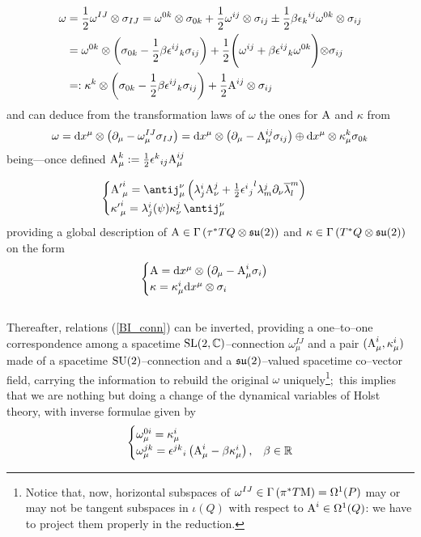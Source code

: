 \begin{align*}
    \omega&=\frac{1}{2}\omega^{IJ}\otimes\sigma_{IJ}=\omega^{0k}\otimes\sigma_{0k}+\frac{1}{2}\omega^{ij}\otimes\sigma_{ij}\pm\frac{1}{2}\beta{\epsilon_k}^{ij}\omega^{0k}\otimes\sigma_{ij}\\
    &=\omega^{0k}\otimes\left(\sigma_{0k}-\frac{1}{2}\beta{\epsilon^{ij}}_k\sigma_{ij}\right)+\frac{1}{2}\Biggl(\omega^{ij}+\beta{\epsilon^{ij}}_k\omega^{0k}\Biggl)\otimes\sigma_{ij}\\
    &=:\kappa^k\otimes\left(\sigma_{0k}-\frac{1}{2}\beta{\epsilon^{ij}}_k\sigma_{ij}\right)+\frac{1}{2}\text{\normalfont A}^{ij}\otimes\sigma_{ij}
\end{align*}
and can deduce from the transformation laws of $\omega$ the ones for $\text{\normalfont A}$ and $\kappa$ from
$$\omega=\text{\normalfont d} x^\mu\otimes\left(\partial_\mu-\omega^{IJ}_\mu\sigma_{IJ}\right)=\text{\normalfont d} x^\mu\otimes\left(\partial_\mu-\text{\normalfont A}^{ij}_\mu\sigma_{ij}\right)\oplus\text{\normalfont d} x^\mu\otimes\kappa^k_\mu\sigma_{0k}$$
being---once defined $\text{\normalfont A}^k_\mu:=\frac{1}{2}{\epsilon^k}_{ij}\text{\normalfont A}^{ij}_\mu$

$$\begin{cases}
{\A'}^i_\mu=\antij^\nu_\mu\left(\lambda^i_j\A_\nu^j+\frac{1}{2}{{\epsilon^i}_j}^l\lambda^j_m\der_\nu\overline{\lambda}^m_l\right)\\
{\kappa'}^i_\mu=\lambda^i_j(\psi)\kappa^j_\nu\,\antij^\nu_\mu
\end{cases}$$
providing a global description of $\text{\normalfont A}\in\Gamma\left(\tau^*TQ\otimes\mathfrak{su}(2)\right)$ and $\kappa\in\Gamma\left(T^*Q\otimes\mathfrak{su}(2)\right)$ on the form
$$\begin{cases}
    \text{\normalfont A}=\text{\normalfont d} x^\mu\otimes\left(\partial_\mu-\text{\normalfont A}^i_\mu\sigma_i\right)\\
    \kappa=\kappa^i_\mu\text{\normalfont d} x^\mu\otimes\sigma_i
\end{cases}$$
\\
Thereafter, relations (\ref{BI_conn}) can be inverted, providing a one--to--one correspondence among a spacetime $\text{\normalfont SL}(2,\mathbb{C})$--connection $\omega^{IJ}_\mu$ and a pair $(\text{\normalfont A}_\mu^i,\kappa^i_\mu)$ made of a spacetime $\text{\normalfont SU}(2)$--connection and a $\mathfrak{su}(2)$--valued spacetime co--vector field, carrying the information to rebuild the original $\omega$ uniquely\footnote{Notice that, now, horizontal subspaces of $\omega^{IJ}\in\Gamma\left(\pi^*T\text{\normalfont M}\right)=\Omega^1(P)$ may or may not be tangent subspaces in $\iota(Q)$ with respect to $\text{\normalfont A}^i\in\Omega^1(Q)$: we have to project them properly in the reduction.};\, this implies that we are nothing but doing a change of the dynamical variables of Holst theory, with inverse formulae given by
\begin{equation}\label{inverse_BI}
    \begin{cases}
    \omega^{0i}_\mu=\kappa_\mu^i\\
    \omega^{jk}_\mu={\epsilon^{jk}}_i\left(\text{\normalfont A}^i_\mu-\beta\kappa^i_\mu\right), & \beta\in\mathbb{R}
\end{cases}
\end{equation}

